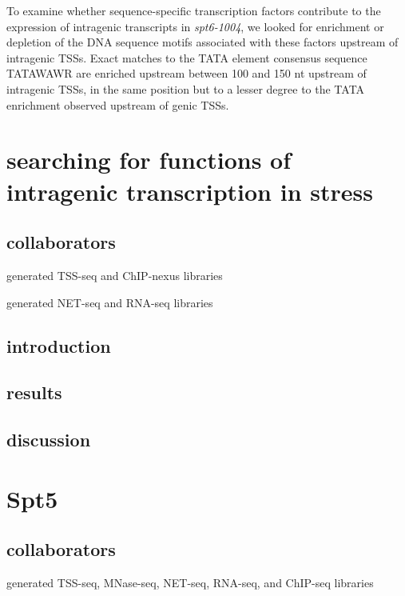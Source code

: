 \documentclass[9pt, letterpaper]{article}
\begin{document}
To examine whether sequence-specific transcription factors contribute to the expression of intragenic transcripts in \textit{spt6-1004}, we looked for enrichment or depletion of the DNA sequence motifs associated with these factors upstream of intragenic TSSs. Exact matches to the TATA element consensus sequence TATAWAWR are enriched upstream between 100 and 150 nt upstream of intragenic TSSs, in the same position but to a lesser degree to the TATA enrichment observed upstream of genic TSSs.

\pagebreak
\section{searching for functions of intragenic transcription in stress}

\subsection{collaborators}

\begin{description}[align=right, labelwidth=5cm, noitemsep]
    \item [Steve Doris] generated TSS-seq and ChIP-nexus libraries
    \item [Blake Tye] generated NET-seq and RNA-seq libraries
\end{description}

\subsection{introduction}
\subsection{results}
\subsection{discussion}

\pagebreak

\section{Spt5}

\subsection{collaborators}

\begin{description}[align=right, labelwidth=5cm, noitemsep]
    \item [Ameet Shetty] generated TSS-seq, MNase-seq, NET-seq, RNA-seq, and ChIP-seq libraries
\end{description}
\end{document}
